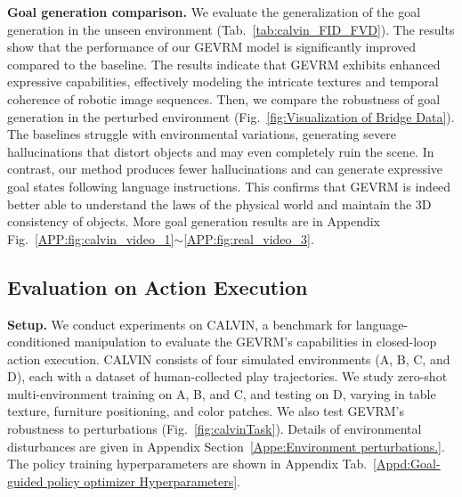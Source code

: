 \textbf{Goal generation comparison.}
We evaluate the generalization of the goal generation in the unseen environment (Tab.~\ref{tab:calvin_FID_FVD}).
The results show that the performance of our GEVRM model is significantly improved compared to the baseline.
The results indicate that GEVRM exhibits enhanced expressive capabilities, effectively modeling the intricate textures and temporal coherence of robotic image sequences.
Then, we compare the robustness of goal generation in the perturbed environment (Fig.~\ref{fig:Visualization of Bridge Data}).
The baselines struggle with environmental variations, generating severe hallucinations that distort objects and may even completely ruin the scene.
In contrast, our method produces fewer hallucinations and can generate expressive goal states following language instructions.
This confirms that GEVRM is indeed better able to understand the laws of the physical world and maintain the 3D consistency of objects.
More goal generation results are in Appendix Fig.~\ref{APP:fig:calvin_video_1}$\sim$\ref{APP:fig:real_video_3}.



\subsection{Evaluation on Action Execution}


\textbf{Setup.} We conduct experiments on CALVIN, a benchmark for language-conditioned manipulation to evaluate the GEVRM's capabilities in closed-loop action execution.
CALVIN consists of four simulated environments (A, B, C, and D), each with a dataset of human-collected play trajectories. 
We study zero-shot multi-environment training on A, B, and C, and testing on D, varying in table texture, furniture positioning, and color patches. We also test GEVRM's robustness to perturbations (Fig.~\ref{fig:calvinTask}).
Details of environmental disturbances are given in Appendix Section~\ref{Appe:Environment perturbations.}.
The policy training hyperparameters are shown in Appendix Tab.~\ref{Appd:Goal-guided policy optimizer Hyperparameters}.


